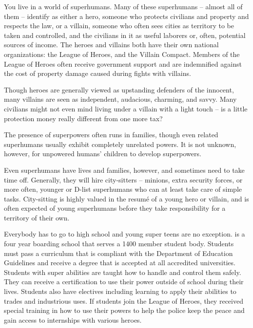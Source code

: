 \documentclass[blue]{LRSguildcamp1}
\begin{document}
\name{\bWorld{}}
You live in a world of superhumans.  Many of these superhumans -- almost all of them -- identify as either a hero, someone who protects civilians and property and respects the law, or a villain, someone who often sees cities as territory to be taken and controlled, and the civilians in it as useful laborers or, often, potential sources of income.  The heroes and villains both have their own national organizations: the League of Heroes, and the Villain Compact.  Members of the League of Heroes often receive government support and are indemnified against the cost of property damage caused during fights with villains.

Though heroes are generally viewed as upstanding defenders of the innocent, many villains are seen as independent, audacious, charming, and savvy.  Many civilians might not even mind living under a villain with a light touch -- is a little protection money really different from one more tax?

The presence of superpowers often runs in families, though even related superhumans usually exhibit completely unrelated powers.  It is not unknown, however, for unpowered humans' children to develop superpowers.

Even superhumans have lives and families, however, and sometimes need to take time off.  Generally, they will hire city-sitters -- minions, extra security forces, or more often, younger or D-list superhumans who can at least take care of simple tasks.  City-sitting is highly valued in the resum\'e of a young hero or villain, and is often expected of young superhumans before they take responsibility for a territory of their own.

Everybody has to go to high school and young super teens are no exception. \pSuperSchool{} is a four year boarding school that serves a 1400 member student body. Students must pass a curriculum that is compliant with the Department of Education Guidelines and receive a degree that is accepted at all accredited universities. Students with super abilities are taught how to handle and control them safely. They can receive a certification to use their power outside of school during their lives. Students also have electives including learning to apply their abilities to trades and industrious uses.  If students join the League of Heroes, they received special training in how to use their powers to help the police keep the peace and gain access to internships with various heroes. 
\end{document}
